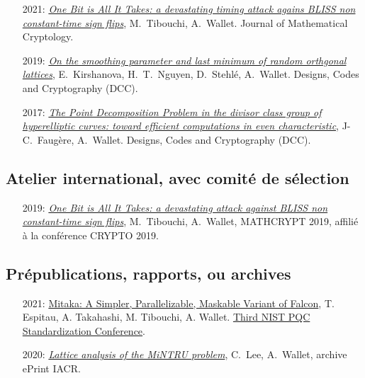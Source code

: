 \documentclass[11pt]{article}
\begin{document}
\begin{itemize}
    \item[2021:]   \href{https://eprint.iacr.org/2019/898.pdf}{\em One Bit is All It Takes: a devastating timing attack agains BLISS non constant-time sign flips}, M.~Tibouchi, A.~Wallet. Journal of Mathematical Cryptology.
    \item[2019:]   \href{https://eprint.iacr.org/2020/057.pdf}{\em On the smoothing parameter and last minimum of random orthgonal lattices}, E.~Kirshanova, H.~T.~Nguyen, D.~Stehlé, A.~Wallet.
    Designs, Codes and Cryptography (DCC).

  \item[2017:]  \href{https://awallet.github.io/images/HyperSum.pdf}{\em The Point Decomposition Problem in the divisor class group of hyperelliptic curves: toward efficient computations in even characteristic}, J-C.~Faugère, A.~Wallet. Designs, Codes and Cryptography (DCC).
\end{itemize}
  

\subsection*{Atelier international, avec comité de sélection}

\begin{itemize}
\item[2019:] \href{https://eprint.iacr.org/2019/898.pdf}{\em One Bit is All It Takes: a devastating attack against BLISS non constant-time sign flips}, M.~Tibouchi, A.~Wallet, MATHCRYPT 2019, affilié à la conférence CRYPTO 2019.
\end{itemize}


\subsection*{Prépublications, rapports, ou  archives}

\begin{itemize}[label=$\bullet$]
\item[2021:] \href{https://csrc.nist.gov/CSRC/media/Events/third-pqc-standardization-conference/documents/accepted-papers/espitau-mitaka-pqc2021.pdf}{Mitaka: A Simpler, Parallelizable, Maskable Variant of Falcon}, T. Espitau, A. Takahashi, M. Tibouchi, A. Wallet. \href{https://csrc.nist.gov/events/2021/third-pqc-standardization-conference}{Third NIST PQC Standardization Conference}.
\item[2020:] \href{https://eprint.iacr.org/2020/230}{\em Lattice analysis of the MiNTRU problem}, C.~Lee, A.~Wallet, archive ePrint IACR.
\end{itemize}
\end{document}

